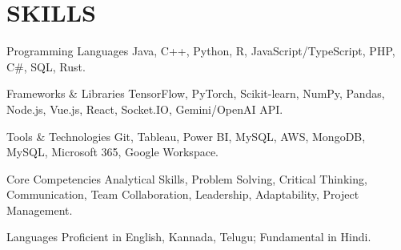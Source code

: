 \documentclass[10pt, letterpaper]{article}
\begin{document}
\vspace{\headerSpacing}

\section{SKILLS}

\begin{skillcategory}{Programming Languages}
    Java, C++, Python, R, JavaScript/TypeScript, PHP, C\#, SQL, Rust.
\end{skillcategory}

\begin{skillcategory}{Frameworks \& Libraries}
    TensorFlow, PyTorch, Scikit-learn, NumPy, Pandas, Node.js, Vue.js, React, Socket.IO, Gemini/OpenAI API.
\end{skillcategory}

\begin{skillcategory}{Tools \& Technologies}
    Git, Tableau, Power BI, MySQL, AWS, MongoDB, MySQL, Microsoft 365, Google Workspace.
\end{skillcategory}

\begin{skillcategory}{Core Competencies}
    Analytical Skills, Problem Solving, Critical Thinking, Communication, Team Collaboration, Leadership, Adaptability, Project Management.
\end{skillcategory}

\begin{skillcategory}{Languages}
    Proficient in English, Kannada, Telugu; Fundamental in Hindi.
\end{skillcategory}

\vspace{\headerSpacing}

\end{document}
